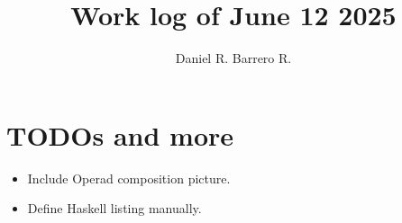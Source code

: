 \documentclass{amsart}
\title{Work log of June 12 2025}
\author{Daniel R. Barrero R.}
\begin{document}
\maketitle

\section{TODOs and more}

\begin{itemize}
	\item Include Operad composition picture.
	\item Define Haskell listing manually.
\end{itemize}
\end{document}
